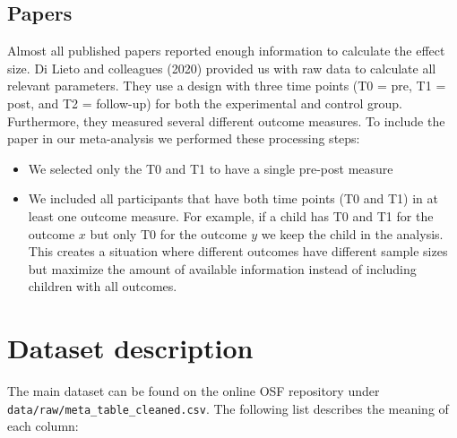 \documentclass[
]{article}
\providecommand{\tightlist}{%
  \setlength{\itemsep}{0pt}\setlength{\parskip}{0pt}}
\begin{document}
\hypertarget{papers}{%
\subsection{Papers}\label{papers}}

Almost all published papers reported enough information to calculate the effect size. Di Lieto and colleagues (2020) provided us with raw data to calculate all relevant parameters. They use a design with three time points (T0 = pre, T1 = post, and T2 = follow-up) for both the experimental and control group. Furthermore, they measured several different outcome measures. To include the paper in our meta-analysis we performed these processing steps:

\begin{itemize}
\tightlist
\item
  We selected only the T0 and T1 to have a single pre-post measure
\item
  We included all participants that have both time points (T0 and T1) in at least one outcome measure. For example, if a child has T0 and T1 for the outcome \(x\) but only T0 for the outcome \(y\) we keep the child in the analysis. This creates a situation where different outcomes have different sample sizes but maximize the amount of available information instead of including children with all outcomes.
\end{itemize}

\hypertarget{dataset}{%
\section{Dataset description}\label{dataset}}

The main dataset can be found on the online OSF repository under \texttt{data/raw/meta\_table\_cleaned.csv}. The following list describes the meaning of each column:
\end{document}

